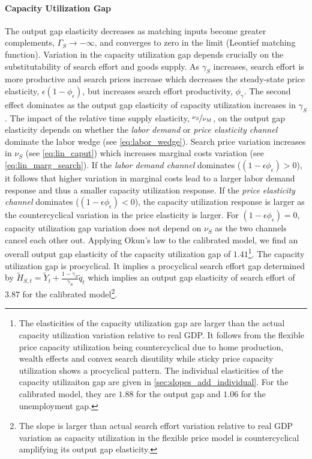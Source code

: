 \documentclass[12pt,3p,authoryear,review]{elsarticle}
\begin{document}
\paragraph{Capacity Utilization Gap}%
The output gap elasticity decreases as matching inputs become greater complements, $\Gamma_S \rightarrow - \infty$, and converges to zero in the limit (Leontief matching function). Variation in the capacity utilization gap depends crucially on the substitutability of search effort and goods supply. As $\gamma_S$ increases, search effort is more productive and search prices increase which decreases the steady-state price elasticity, $\epsilon(1-\phi_\epsilon)$, but increases search effort productivity, $\phi_\gamma$. The second effect dominates as the output gap elasticity of capacity utilization increases in $\gamma_S$. The impact of the relative time supply elasticity, $\nicefrac{\nu_S}{\nu_M}$, on the output gap elasticity depends on whether the \emph{labor demand} or \emph{price elasticity channel} dominate the labor wedge (see \eqref{eq:labor_wedge}). Search price variation increases in $\nu_S$ (see \eqref{eq:lin_caput}) which increases marginal costs variation (see \eqref{eq:lin_marg_search}). If the \emph{labor demand channel} dominates ($(1-\epsilon\phi_\epsilon)>0$), it follows that higher variation in marginal costs lead to a larger labor demand response and thus a smaller capacity utilization response. If the \emph{price elasticity channel} dominates ($(1-\epsilon\phi_\epsilon)<0$), the capacity utilization response is larger as the countercyclical variation in the price elasticity is larger. For $(1-\epsilon\phi_\epsilon)=0$, capacity utilization gap variation does not depend on $\nu_S$ as the two channels cancel each other out. Applying Okun's law to the calibrated model, we find an overall output gap elasticity of the capacity utilization gap of $1.41$\footnote{The elasticities of the capacity utilization gap are larger than the actual capacity utilization variation relative to real GDP. It follows from the flexible price capacity utilization being countercyclical due to home production, wealth effects and convex search disutility while sticky price capacity utilization shows a procyclical pattern. The individual elasticities of the capacity utilizaiton gap are given in \ref{sec:slopes_add_individual}. For the calibrated model, they are $1.88$ for the output gap and $1.06$ for the unemployment gap.}. The capacity utilization gap is procyclical. It implies a procyclical search effort gap determined by $\tilde{H}_{S,t} = \tilde{Y}_t + \frac{1-\gamma_S}{\gamma_S} \tilde{q}_t$ which implies an output gap elasticity of search effort of $3.87$ for the calibrated model\footnote{The slope is larger than actual search effort variation relative to real GDP variation as capacity utilization in the flexible price model is countercyclical amplifying its output gap elasticity.}.%
\end{document}
